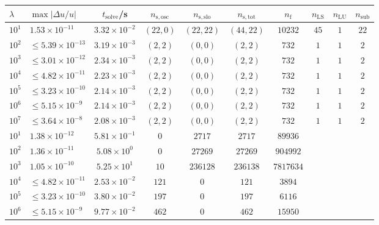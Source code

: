 \begin{tabular}{l l c c c c c c c c}%
\hline \hline 
$\lambda$  &  $\max|\Delta u/u|$  &  $t_{\mathrm{solve}}$/\si{\s} &  $n_{\mathrm{s,osc}}$  &  $n_{\mathrm{s,slo}}$
&  $n_{\mathrm{s,tot}}$  &  $n_{\mathrm{f}}$  &  $n_{\mathrm{LS}}$  &
$n_{\mathrm{LU}}$  &  $n_{\mathrm{sub}}$ \\ \hline
$10^1$  &  $1.53 \times 10^{-11}$  &  $3.32\times 10^{-2}$    &  $(22, 0)$  &  $(22, 22)$  &  $(44, 22)$  &  $10232$  &  $45$  &  $1$  &  $22$\\ 
    $10^2$  &  $\leq 5.39 \times 10^{-13}$  &  $3.19\times 10^{-3}$    &  $(2, 2)$  &  $(0, 0)$  &  $(2, 2)$  &  $732$  &  $1$  &  $1$  &  $2$\\ 
    $10^3$  &  $\leq 3.01 \times 10^{-12}$  &  $2.34\times 10^{-3}$    &  $(2, 2)$  &  $(0, 0)$  &  $(2, 2)$  &  $732$  &  $1$  &  $1$  &  $2$\\ 
$10^4$  &  $\leq 4.82 \times 10^{-11}$  &  $2.23\times 10^{-3}$    &  $(2, 2)$  &  $(0, 0)$  &  $(2, 2)$  &  $732$  &  $1$  &  $1$  &  $2$\\ 
$10^5$  &  $\leq 3.23 \times 10^{-10}$  &  $2.14\times 10^{-3}$    &  $(2, 2)$  &  $(0, 0)$  &  $(2, 2)$  &  $732$  &  $1$  &  $1$  &  $2$\\ 
$10^6$  &  $\leq 5.15 \times 10^{-9}$  &  $2.14\times 10^{-3}$     &  $(2, 2)$  &  $(0, 0)$  &  $(2, 2)$  &  $732$  &  $1$  &  $1$  &  $2$\\ 
$10^7$  &  $\leq 3.64 \times 10^{-8}$  &  $2.08\times 10^{-3}$    &  $(2, 2)$  &  $(0, 0)$  &  $(2, 2)$  &  $732$  &  $1$  &  $1$  &  $2$\\ 
\hline \hline
$10^1$  &  $1.38 \times 10^{-12}$  &  $5.81 \times 10^{-1}$    &  $0$  &  $2717$  &  $2717$  &  $89936$ & & &  \\ 
$10^2$  &  $1.36 \times 10^{-11}$  &  $5.08 \times 10^{0}$    &  $0$  &  $27269$  &  $27269$  &  $904992$  & & & \\ 
$10^3$  &  $1.05 \times 10^{-10}$  &  $5.25 \times 10^{1}$    &  $10$  &  $236128$  &  $236138$  &  $7817634$  & & & \\ 
    $10^4$  &  $\leq 4.82 \times 10^{-11}$  &  $2.53 \times 10^{-2}$    &  $121$  &  $0$  &  $121$  &  $3894$  & & & \\ 
    $10^5$  &  $\leq 3.23 \times 10^{-10}$  &  $3.80 \times 10^{-2}$    &  $197$  &  $0$  &  $197$  &  $6116$  & & & \\ 
    $10^6$  &  $\leq 5.15 \times 10^{-9}$  &  $9.77 \times 10^{-2}$    &  $462$  &  $0$  &  $462$  &  $15950$  & & & \\ 

\end{tabular}
